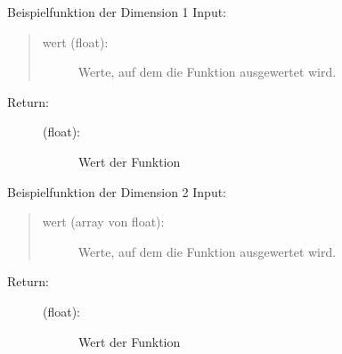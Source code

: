 \documentclass[letterpaper,10pt,ngerman]{sphinxmanual}
\begin{document}
\begin{fulllineitems}
\label{\detokenize{index:aufg_5_2.fntn1}}
Beispielfunktion der Dimension 1
Input:
\begin{quote}
\begin{description}
\item[{wert (float):}] \leavevmode
Werte, auf dem die Funktion ausgewertet wird.

\end{description}
\end{quote}
\begin{description}
\item[{Return:}] \leavevmode\begin{description}
\item[{(float):}] \leavevmode
Wert der Funktion

\end{description}

\end{description}

\end{fulllineitems}


\begin{fulllineitems}
\label{\detokenize{index:aufg_5_2.fntn2}}
Beispielfunktion der Dimension 2
Input:
\begin{quote}
\begin{description}
\item[{wert (array von float):}] \leavevmode
Werte, auf dem die Funktion ausgewertet wird.

\end{description}
\end{quote}
\begin{description}
\item[{Return:}] \leavevmode\begin{description}
\item[{(float):}] \leavevmode
Wert der Funktion

\end{description}

\end{description}

\end{fulllineitems}
\end{document}
